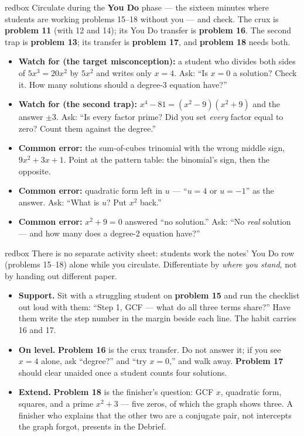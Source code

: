 \documentclass[10pt]{article}
\begin{document}
\begin{skillbox}{redbox}
Circulate during the \textbf{You Do} phase --- the sixteen minutes where students are working
problems 15--18 without you --- and check. The crux is \textbf{problem 11} (with 12 and 14);
its You Do transfer is \textbf{problem 16}. The second trap is \textbf{problem 13}; its transfer
is \textbf{problem 17}, and \textbf{problem 18} needs both.
\begin{itemize}
  \item \textbf{Watch for (the target misconception):} a student who divides both sides of
        $5x^3 = 20x^2$ by $5x^2$ and writes only $x = 4$. Ask: ``Is $x = 0$ a solution? Check
        it. How many solutions should a degree-3 equation have?''
  \item \textbf{Watch for (the second trap):} $x^4 - 81 = (x^2 - 9)(x^2 + 9)$ and the answer
        $\pm 3$. Ask: ``Is every factor prime? Did you set \emph{every} factor equal to zero?
        Count them against the degree.''
  \item \textbf{Common error:} the sum-of-cubes trinomial with the wrong middle sign,
        $9x^2 + 3x + 1$. Point at the pattern table: the binomial's sign, then the opposite.
  \item \textbf{Common error:} quadratic form left in $u$ --- ``$u = 4$ or $u = -1$'' as the
        answer. Ask: ``What is $u$? Put $x^2$ back.''
  \item \textbf{Common error:} $x^2 + 9 = 0$ answered ``no solution.'' Ask: ``No \emph{real}
        solution --- and how many does a degree-2 equation have?''
\end{itemize}
\end{skillbox}

\begin{skillbox}{redbox}
There is no separate activity sheet: students work the notes' You Do row (problems 15--18)
alone while you circulate. Differentiate by \textit{where you stand}, not by handing out
different paper.

\begin{itemize}
  \item \textbf{Support.} Sit with a struggling student on \textbf{problem 15} and run the
        checklist out loud with them: ``Step 1, GCF --- what do all three terms share?'' Have
        them write the step number in the margin beside each line. The habit carries 16 and 17.
  \item \textbf{On level.} \textbf{Problem 16} is the crux transfer. Do not answer it; if you
        see $x = 4$ alone, ask ``degree?'' and ``try $x = 0$,'' and walk away.
        \textbf{Problem 17} should clear unaided once a student counts four solutions.
  \item \textbf{Extend.} \textbf{Problem 18} is the finisher's question: GCF $x$, quadratic
        form, squares, and a prime $x^2 + 3$ --- five zeros, of which the graph shows three.
        A finisher who explains that the other two are a conjugate pair, not intercepts the
        graph forgot, presents in the Debrief.
\end{itemize}
\end{skillbox}
\end{document}
